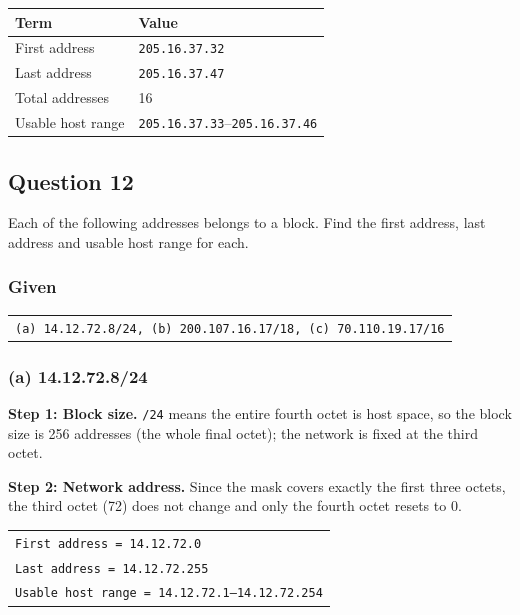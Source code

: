 \documentclass[11pt,a4paper]{article}
\begin{document}
\begin{tabularx}{\textwidth}{@{}lX@{}}
\toprule
\rowcolor{tablehead}\textbf{Term} & \textbf{Value} \\
\midrule
First address & \texttt{205.16.37.32} \\
Last address & \texttt{205.16.37.47} \\
Total addresses & 16 \\
Usable host range & \texttt{205.16.37.33}--\texttt{205.16.37.46} \\
\bottomrule
\end{tabularx}

\subsection*{Question 12}

Each of the following addresses belongs to a block. Find the first address, last address and
usable host range for each.

\subsubsection*{Given}

\begin{tabularx}{\textwidth}{@{}X@{}}
\texttt{(a) 14.12.72.8/24, (b) 200.107.16.17/18, (c) 70.110.19.17/16} \\
\end{tabularx}

\subsubsection*{(a) 14.12.72.8/24}

\textbf{Step 1: Block size.} \texttt{/24} means the entire fourth octet is host
space, so the block size is 256 addresses (the whole final octet); the network
is fixed at the third octet.

\textbf{Step 2: Network address.} Since the mask covers exactly the first three
octets, the third octet (72) does not change and only the fourth octet resets
to 0.

\begin{tabularx}{\textwidth}{@{}X@{}}
\texttt{First address = 14.12.72.0} \\
\texttt{Last address = 14.12.72.255} \\
\texttt{Usable host range = 14.12.72.1--14.12.72.254} \\
\end{tabularx}
\end{document}
